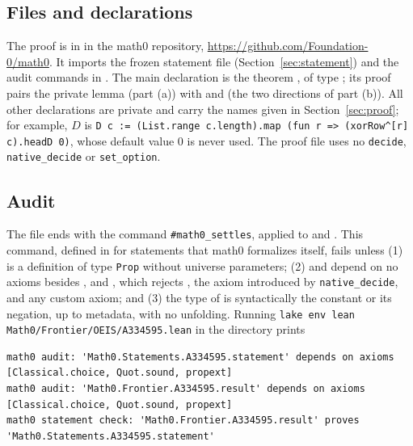 \documentclass[11pt]{amsart}
\theoremstyle{plain}
\theoremstyle{definition}
\begin{document}
\subsection*{Files and declarations}
The proof is in  in the math0 repository, \url{https://github.com/Foundation-0/math0}. It imports the frozen statement file (Section~\ref{sec:statement}) and the audit commands in . The main declaration is the theorem , of type ; its proof pairs the private lemma  (part (a)) with  and  (the two directions of part (b)). All other declarations are private and carry the names given in Section~\ref{sec:proof}; for example, $D$ is \texttt{D c := (List.range c.length).map (fun r => (xorRow\^{}[r] c).headD 0)}, whose default value $0$ is never used. The proof file uses no \texttt{decide}, \texttt{native\_decide} or \texttt{set\_option}.

\subsection*{Audit}
The file ends with the command \texttt{\#math0\_settles}, applied to  and . This command, defined in  for statements that math0 formalizes itself, fails unless (1)  is a definition of type \texttt{Prop} without universe parameters; (2)  and  depend on no axioms besides ,  and , which rejects , the axiom  introduced by \texttt{native\_decide}, and any custom axiom; and (3) the type of  is syntactically the constant  or its negation, up to metadata, with no unfolding. Running \texttt{lake env lean Math0/Frontier/OEIS/A334595.lean} in the directory  prints
\begin{lstlisting}[basicstyle=\ttfamily\scriptsize]
math0 audit: 'Math0.Statements.A334595.statement' depends on axioms [Classical.choice, Quot.sound, propext]
math0 audit: 'Math0.Frontier.A334595.result' depends on axioms [Classical.choice, Quot.sound, propext]
math0 statement check: 'Math0.Frontier.A334595.result' proves 'Math0.Statements.A334595.statement'
\end{lstlisting}
\end{document}
